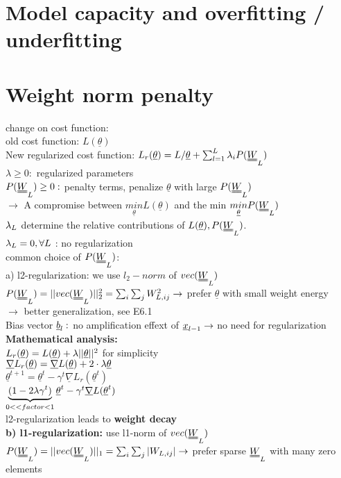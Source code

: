 \section{Model capacity and overfitting / underfitting}
\section{Weight norm penalty}
change on cost function: \\
\textbullet old cost function: $ L(\underline{\theta}) $\\
\textbullet New regularized cost function: $ L_r (\underline{\theta}) = L /\underline{\theta}  + \sum_{l=1}^{L} \lambda_i P(\W_L)$ \\
$  \lambda \geq 0: $ regularized parameters \\
$  P(\W_L) \geq 0 :  $ penalty terms, penalize $  \underline{\theta} $ with large $ P(\W_L) $\\
$ \rightarrow  $ A compromise between $ \underset{\underline{\theta}}{min} L(\underline{\theta}) $ and the min $ \underset{\underline{\theta}}{min} P(\W_L) $\\
$ \lambda_L   $ determine the relative contributions of $  L(\underline{\theta}), P(\W_L) $. \\
$  \lambda_L = 0, \forall L  $ : no regularization \\
common choice of $  P(\W_L) $: \\
\textbullet a) l2-regularization: we use $ l_2-norm $ of $ vec(\W_L) $ \\
$  P(\W_L) = || vec (\W_L ) ||^2_{2} = \sum_{i}^{} \sum_{j}^{} W_{L,ij}^2 \rightarrow $ prefer $ \underline{\theta} $ with small weight energy \\
$\rightarrow$ better generalization, see E6.1\\
Bias vector $ {\underline b}_l: $ no amplification effext of $ {\underline x}_{l-1} \rightarrow  $ no need for regularization \\
\textbf{Mathematical analysis:}\\
$  L_r (\underline{\theta}  ) = L(\underline{\theta}) + \lambda || \underline{\theta} ||^2 $ for simplicity \\
$ \underline{\nabla} L_r (\underline{\theta}) = \underline{\nabla} L(\underline{\theta}) + 2 \cdot \lambda \underline{\theta} $ \\
$ \underline{\theta}^{t+1} = \underline{\theta}^t - \gamma^t \underline{\nabla } L_r (\underline{\theta}^t) $ \\
 $\underbrace{(1- 2 \lambda \gamma^t)}_{0 << factor <1}  \underline{\theta}^t - \gamma^t \underline{\nabla} L(\underline{\theta}^t) $\\
 l2-regularization leads to \textbf{weight decay } \\
\textbf{ b) l1-regularization: } use l1-norm of $ vec(\W_L) $ \\
$  P(\W_L) = || vec (\W_L) ||_1 = \sum_i \sum_j | W_{L,ij} | \\
\rightarrow  $ prefer sparse $ \W_L $ with many zero elements\\
